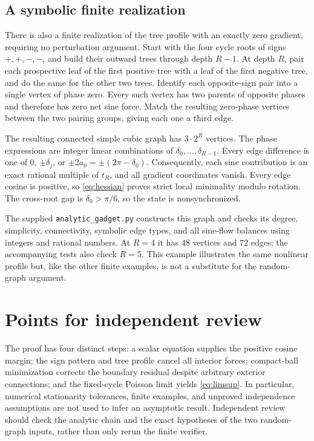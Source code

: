 \documentclass[11pt]{article}
\theoremstyle{definition}
\theoremstyle{remark}
\begin{document}
\subsection{A symbolic finite realization}

There is also a finite realization of the tree profile with an exactly zero
gradient, requiring no perturbation argument. Start with the four cycle roots
of signs $+,+,-,-$, and build their outward trees through depth $R-1$.
At depth $R$, pair each prospective leaf of the first positive tree with a
leaf of the first negative tree, and do the same for the other two trees.
Identify each opposite-sign pair into a single vertex of phase zero.
Every such vertex has two parents of opposite phases and therefore has zero
net sine force. Match the resulting zero-phase vertices between the two
pairing groups, giving each one a third edge.

The resulting connected simple cubic graph has $3\cdot2^R$ vertices.
The phase expressions are integer linear combinations of
$\delta_0,\ldots,\delta_{R-1}$. Every edge difference is one of
$0$, $\pm\delta_j$, or $\pm2a_0=\pm(2\pi-\delta_0)$.
Consequently, each sine contribution is an exact rational multiple of $t_R$,
and all gradient coordinates vanish. Every edge cosine is positive, so
\eqref{eq:hessian} proves strict local minimality modulo rotation. The
cross-root gap is $\delta_0>\pi/6$, so the state is nonsynchronized.

The supplied \texttt{analytic\_gadget.py} constructs this graph and checks
its degree, simplicity, connectivity, symbolic edge types, and all sine-flow
balances using integers and rational numbers. At $R=4$ it has $48$ vertices
and $72$ edges; the accompanying tests also check $R=5$. This example
illustrates the same nonlinear profile but, like the other finite examples,
is not a substitute for the random-graph argument.

\section{Points for independent review}

The proof has four distinct steps: a scalar equation supplies the positive
cosine margin; the sign pattern and tree profile cancel all interior
forces; compact-ball minimization corrects the boundary residual despite
arbitrary exterior connections; and the fixed-cycle Poisson limit yields
\eqref{eq:limsup}. In particular, numerical stationarity tolerances, finite
examples, and unproved independence assumptions are not used to infer an
asymptotic result. Independent review should check the analytic chain and
the exact hypotheses of the two random-graph inputs, rather than only rerun
the finite verifier.
\end{document}
